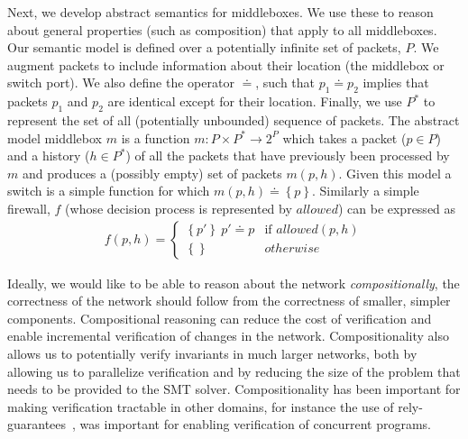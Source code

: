 Next, we develop abstract semantics for middleboxes. We use these to reason about general properties (such as composition) that apply to all middleboxes. Our semantic model is defined over a potentially infinite set of packets, $P$.  We augment packets to include information about their location (\ie the
middlebox or
switch port). We also define the operator $\doteq$, such that $p_1 \doteq p_2$ implies that packets $p_1$ and $p_2$ are identical except for their location.
Finally, we use $P^*$ to represent the set of all (potentially unbounded) sequence of packets.
The abstract model middlebox $m$ is a function $m\colon P\times P^* \to 2^P$ which takes a packet ($p\in P$) and a history ($h\in P^*$) 
of all the packets that have
previously been processed by $m$ and produces a (possibly empty) set of packets $m(p, h)$. Given this model a switch is a simple function for which
$m(p, h) \doteq \left\{p\right\}$. Similarly a simple firewall, $f$ (whose decision process is represented by $allowed$) can be expressed as
\begin{align*}
 f(p, h) = \begin{cases}
    \left\{p'\right\}\ p' \doteq p & \mbox{if } allowed(p, h)\\
    \left\{\right\} & otherwise
 \end{cases}
\end{align*}

Ideally, we would like to be able to reason about the network \emph{compositionally}, \ie the correctness of the network should follow from
the correctness of smaller, simpler components. Compositional reasoning can reduce the cost of verification and enable incremental verification
of changes in the network. Compositionality also allows us to potentially verify invariants in much larger networks, both by allowing us to parallelize verification and by reducing the size of the problem that needs to be provided to the SMT solver. Compositionality has been important for making verification tractable in other domains, for instance the use of rely-guarantees~\cite{tse:MisraC81,ifip:Jones83}, was important for enabling verification of concurrent programs.

